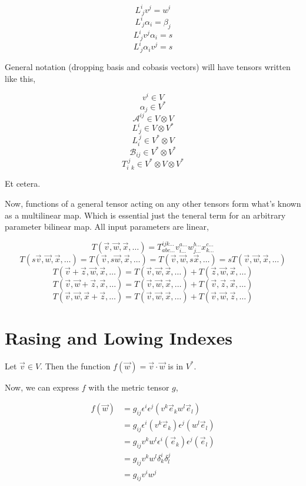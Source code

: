\documentclass[12pt]{book}
\theoremstyle{plain}
\theoremstyle{definition}
\theoremstyle{ppart}
\theoremstyle{case}
\theoremstyle{solution}
\begin{document}
\[ L^i_{~j} v^j = w^i \]
\[ L^i_{~j} \alpha_i = \beta_j \]
\[ L^i_{~j} v^j \alpha_i = s \]
\[ L^i_{~j} \alpha_i v^j = s \]

General notation (dropping basis and cobasis vectors) will have tensors written like this,

\[ v^i \in V \]
\[ \alpha_j \in V^* \]
\[ \mathcal{A}^{ij} \in V \otimes V \]
\[ L^{i}_{~j} \in V \otimes V^* \]
\[ L^{~j}_{i} \in V^* \otimes V \]
\[ \mathcal{B}_{ij} \in V^* \otimes V^* \]
\[ T^{~j}_{i~~k} \in V^* \otimes V \otimes V^* \]

Et cetera.

Now, functions of a general tensor acting on any other tensors form what's known as a multilinear map. Which is essential just the
teneral term for an arbitrary parameter bilinear map. All input parameters are linear,

\[ T(\vec{v}, \vec{w}, \vec{x}, \dots) = T^{ijk\dots}_{abc\dots} v^{a\dots}_{i\dots} w^{b\dots}_{j\dots} x^{c\dots}_{k\dots} \]
\[ T(s\vec{v}, \vec{w}, \vec{x}, \dots) = T(\vec{v}, s\vec{w}, \vec{x}, \dots) = T(\vec{v}, \vec{w}, s\vec{x}, \dots) = s T(\vec{v}, \vec{w}, \vec{x}, \dots) \]
\[ T(\vec{v}+\vec{z}, \vec{w}, \vec{x}, \dots) = T(\vec{v}, \vec{w}, \vec{x}, \dots) + T(\vec{z}, \vec{w}, \vec{x}, \dots)\]
\[ T(\vec{v}, \vec{w}+\vec{z}, \vec{x}, \dots) = T(\vec{v}, \vec{w}, \vec{x}, \dots) + T(\vec{v}, \vec{z}, \vec{x}, \dots)\]
\[ T(\vec{v}, \vec{w}, \vec{x}+\vec{z}, \dots) = T(\vec{v}, \vec{w}, \vec{x}, \dots) + T(\vec{v}, \vec{w}, \vec{z}, \dots)\]

\chapter{Rasing and Lowing Indexes}

Let $\vec{v} \in V$. Then the function $f(\vec{w}) = \vec{v} \cdot \vec{w}$ is in $V^*$.

Now, we can express $f$ with the metric tensor $g$,

\begin{align*}
  f(\vec{w}) &= g_{ij} \epsilon^i \epsilon^j (v^k \vec{e}_k w^l \vec{e}_l) \\
  &= g_{ij} \epsilon^i (v^k \vec{e}_k) \epsilon^j (w^l \vec{e}_l) \\
  &= g_{ij} v^k w^l \epsilon^i (\vec{e}_k) \epsilon^j (\vec{e}_l) \\
  &= g_{ij} v^k w^l \delta^i_k \delta^j_l \\
  &= g_{ij} v^i w^j \\
\end{align*}
\end{document}
